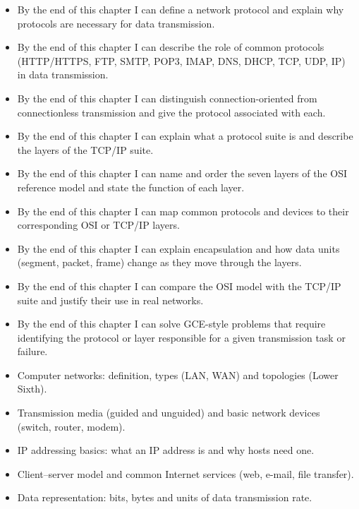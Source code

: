 \documentclass[11pt]{article}
\begin{document}
\begin{objectifs}
\begin{itemize}
\item By the end of this chapter I can define a network protocol and explain why protocols are necessary for data transmission.
\item By the end of this chapter I can describe the role of common protocols (HTTP/HTTPS, FTP, SMTP, POP3, IMAP, DNS, DHCP, TCP, UDP, IP) in data transmission.
\item By the end of this chapter I can distinguish connection-oriented from connectionless transmission and give the protocol associated with each.
\item By the end of this chapter I can explain what a protocol suite is and describe the layers of the TCP/IP suite.
\item By the end of this chapter I can name and order the seven layers of the OSI reference model and state the function of each layer.
\item By the end of this chapter I can map common protocols and devices to their corresponding OSI or TCP/IP layers.
\item By the end of this chapter I can explain encapsulation and how data units (segment, packet, frame) change as they move through the layers.
\item By the end of this chapter I can compare the OSI model with the TCP/IP suite and justify their use in real networks.
\item By the end of this chapter I can solve GCE-style problems that require identifying the protocol or layer responsible for a given transmission task or failure.
\end{itemize}
\end{objectifs}

\begin{prerequis}
\begin{itemize}
\item Computer networks: definition, types (LAN, WAN) and topologies (Lower Sixth).
\item Transmission media (guided and unguided) and basic network devices (switch, router, modem).
\item IP addressing basics: what an IP address is and why hosts need one.
\item Client–server model and common Internet services (web, e-mail, file transfer).
\item Data representation: bits, bytes and units of data transmission rate.
\end{itemize}
\end{prerequis}
\end{document}
